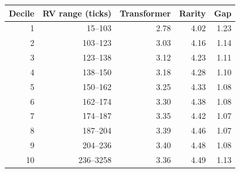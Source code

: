 \begin{tabular}{rrrrr}
\toprule
Decile & RV range (ticks) & Transformer & Rarity & Gap \\
\midrule
1 & 15--103 & 2.78 & 4.02 & 1.23 \\
2 & 103--123 & 3.03 & 4.16 & 1.14 \\
3 & 123--138 & 3.12 & 4.23 & 1.11 \\
4 & 138--150 & 3.18 & 4.28 & 1.10 \\
5 & 150--162 & 3.25 & 4.33 & 1.08 \\
6 & 162--174 & 3.30 & 4.38 & 1.08 \\
7 & 174--187 & 3.35 & 4.42 & 1.07 \\
8 & 187--204 & 3.39 & 4.46 & 1.07 \\
9 & 204--236 & 3.40 & 4.48 & 1.08 \\
10 & 236--3258 & 3.36 & 4.49 & 1.13 \\
\bottomrule
\end{tabular}
